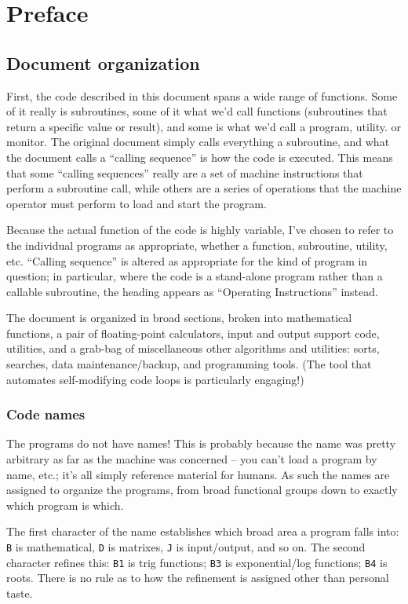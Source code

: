 \section{Preface}
\subsection{Document organization}
First, the code described in this document spans a wide range of functions. Some of it really is subroutines, some of it what we'd call functions (subroutines that return a specific value or result), and some is what we'd
call a program, utility. or monitor. The original document simply calls everything a subroutine, and what the document calls a ``calling sequence'' is how the code is executed. This means that some ``calling sequences'' really are a set of machine instructions that perform a subroutine call, while others are a series of operations that the machine operator must perform to load and start the program.

Because the actual function of the code is highly variable, I've chosen to refer to the individual programs as appropriate, whether a function, subroutine, utility, etc. ``Calling sequence'' is altered as appropriate for the kind of program in question; in particular, where the code is a stand-alone program rather than a callable subroutine, the heading appears as ``Operating Instructions'' instead.

The document is organized in broad sections, broken into mathematical functions, a pair of floating-point calculators, input and output support code, utilities, and a grab-bag of miscellaneous other algorithms and utilities: sorts, searches, data maintenance/backup, and programming tools. (The tool that automates self-modifying code loops is particularly engaging!)

\subsubsection*{Code names}
The programs do not have names! This is probably because the name was pretty arbitrary as far as the machine was concerned -- you can't load a program by name, etc.; it's all simply reference material for humans.
As such the names are assigned to organize the programs, from broad functional groups down to exactly which program is which.

The first character of the name establishes which broad area a program falls into: \texttt{B} is mathematical, \texttt{D} is matrixes, \texttt{J} is input/output, and so on. The second character refines this: \texttt{B1} is trig functions; \texttt{B3} is exponential/log functions; \texttt{B4} is roots. There is no rule as to how the refinement is assigned other than personal taste.

